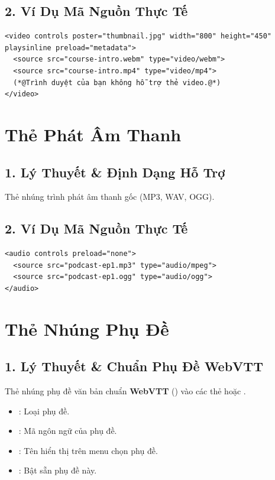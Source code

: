 \subsection{2. Ví Dụ Mã Nguồn Thực Tế}
\begin{lstlisting}[language=HTML5, caption={Ví dụ thẻ video phát chuẩn đa thiết bị}]
<video controls poster="thumbnail.jpg" width="800" height="450" playsinline preload="metadata">
  <source src="course-intro.webm" type="video/webm">
  <source src="course-intro.mp4" type="video/mp4">
  (*@Trình duyệt của bạn không hỗ trợ thẻ video.@*)
</video>
\end{lstlisting}

\section{Thẻ Phát Âm Thanh }
\subsection{1. Lý Thuyết \& Định Dạng Hỗ Trợ}
Thẻ  nhúng trình phát âm thanh gốc (MP3, WAV, OGG).

\subsection{2. Ví Dụ Mã Nguồn Thực Tế}
\begin{lstlisting}[language=HTML5, caption={Ví dụ thẻ audio phát nhạc podcast}]
<audio controls preload="none">
  <source src="podcast-ep1.mp3" type="audio/mpeg">
  <source src="podcast-ep1.ogg" type="audio/ogg">
</audio>
\end{lstlisting}

\section{Thẻ Nhúng Phụ Đề }
\subsection{1. Lý Thuyết \& Chuẩn Phụ Đề WebVTT}
Thẻ  nhúng phụ đề văn bản chuẩn \textbf{WebVTT} () vào các thẻ  hoặc .

\begin{itemize}
    \item {}: Loại phụ đề.
    \item {}: Mã ngôn ngữ của phụ đề.
    \item {}: Tên hiển thị trên menu chọn phụ đề.
    \item {}: Bật sẵn phụ đề này.
\end{itemize}

